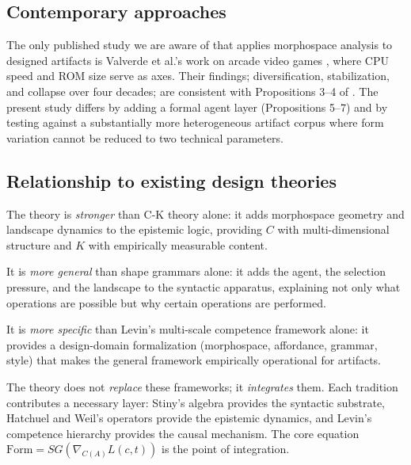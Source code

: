 \subsection{Contemporary approaches}

The only published study we are aware of that applies morphospace analysis to designed artifacts is Valverde et al.'s work on arcade video games \parencite{Valverde2025}, where CPU speed and ROM size serve as axes. Their findings; diversification, stabilization, and collapse over four decades; are consistent with Propositions 3--4 of \formlaere{}. The present study differs by adding a formal agent layer (Propositions 5--7) and by testing against a substantially more heterogeneous artifact corpus where form variation cannot be reduced to two technical parameters.

\subsection{Relationship to existing design theories}

The theory is \textit{stronger} than C-K theory alone: it adds morphospace geometry and landscape dynamics to the epistemic logic, providing $C$ with multi-dimensional structure and $K$ with empirically measurable content.

It is \textit{more general} than shape grammars alone: it adds the agent, the selection pressure, and the landscape to the syntactic apparatus, explaining not only what operations are possible but why certain operations are performed.

It is \textit{more specific} than Levin's multi-scale competence framework alone: it provides a design-domain formalization (morphospace, affordance, grammar, style) that makes the general framework empirically operational for artifacts.

The theory does not \textit{replace} these frameworks; it \textit{integrates} them. Each tradition contributes a necessary layer: Stiny's algebra provides the syntactic substrate, Hatchuel and Weil's operators provide the epistemic dynamics, and Levin's competence hierarchy provides the causal mechanism. The core equation $\mathrm{Form} = SG(\nabla_{C(A)} L(c,t))$ is the point of integration.

